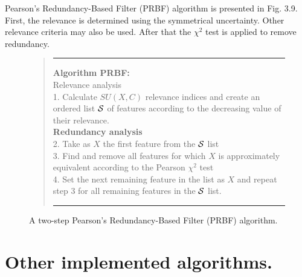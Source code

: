 \documentclass[a4paper,fleqn]{report}
\newcommand\cS{{\cal S}}
\begin{document}
Pearson's Redundancy-Based Filter (PRBF) algorithm is presented in Fig. 3.9. %
First, the relevance is determined using the symmetrical uncertainty. Other relevance criteria may also be used. 
After that the $\chi^2$ test is applied to remove redundancy.
\ \\

\begin{figure}[ht] \label{jbwd:quote:PRBF} %
\vspace*{-0.4cm}
\centering
\begin{quote}
\hrule width 5.6 in
\vspace{0.2cm}
{\bf Algorithm PRBF:} \\
 {Relevance analysis} \\
 1. Calculate $SU(X,C)$ relevance indices and create an ordered list $\cS$ of features according to the decreasing value of their relevance. \\
 {\bf Redundancy analysis} \\
 2. Take as $X$ the first feature from the $\cS$ list \\
 3. Find and remove all features for which $X$ is approximately equivalent according to the Pearson $\chi^2$ test\\
 4. Set the next remaining feature in the list as $X$ and repeat step 3 for all remaining features in the $\cS$ list. 
 \vspace{0.2cm}
 \hrule width 5.6 in
\end{quote}
\caption{A two-step Pearson's Redundancy-Based Filter (PRBF) algorithm.}
\end{figure}


\section{Other implemented algorithms.}
\end{document}
